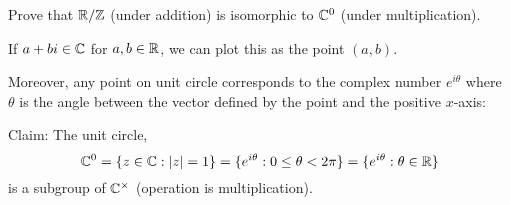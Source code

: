 \documentclass[12pt]{article}
\begin{document}

%	

\newpage
{}
\begin{exercise}
Prove that $\mathbb{R}/\mathbb{Z}$ (under addition) is isomorphic to $\mathbb{C}^0$ (under multiplication).
\end{exercise}
	\begin{recall}
		If $a+bi\in \mathbb{C}$ for $a,b\in\mathbb{R}$, we can plot this as the point $(a,b)$.
		
		Moreover, any point on unit circle corresponds to the complex number $e^{i\theta}$ where $\theta$ is the angle between the vector defined by the point and the positive $x$-axis:
		
		\begin{center}
		\end{center}
		
		
		Claim: The unit circle,$$\mathbb{C}^0 = \{z\in \mathbb{C}:|z|=1\}=\{e^{i\theta} : 0\leq \theta < 2\pi\}=\{e^{i\theta} : \theta\in \mathbb{R}\}$$ is a subgroup of $\mathbb{C}^\times$ (operation is multiplication).
	\end{recall}
	\vfill
\end{document}
